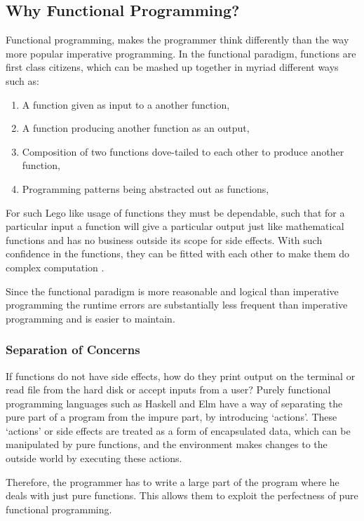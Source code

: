 \subsection{Why Functional Programming?}
Functional programming, makes the programmer think differently than the
way more popular imperative programming. In the functional paradigm, functions are
first class citizens, which can be mashed up together in myriad different ways
such as:


\begin{enumerate}
\item A function given as input to a another function,
\item A function producing another function as an output,
\item Composition of two functions dove-tailed to each other to produce another function,
\item Programming patterns being abstracted out as functions,
\end{enumerate}

For such Lego like usage of functions they must be dependable, such that for a
particular input a function will give a particular output just like
mathematical functions and has no business outside its scope for side effects.
With such confidence in the functions, they can be fitted with each other to
make them do complex computation \citep{Hughes89}.

Since the functional paradigm is more reasonable and logical than imperative
programming the runtime errors are substantially less frequent than imperative
programming and is easier to maintain.


\subsubsection{Separation of Concerns}
If functions do not have side effects, how do they print output on the terminal
or read file from the hard disk or accept inputs from a user? Purely functional
programming languages such as Haskell and Elm have a way of separating the pure %
part of a program from the impure part, by introducing `actions'. These
`actions' or side effects are treated as a form of encapsulated data, which can
be manipulated by pure functions, and the environment makes changes to the
outside world by executing these actions.

Therefore, the programmer has to write a large part of the program where he
deals with just pure functions. This allows them to exploit the perfectness of
pure functional programming.

